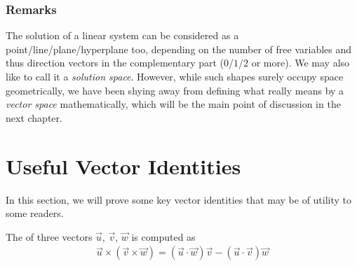 \subsubsection{Remarks}
The solution of a linear system can be considered as a point/line/plane/hyperplane too, depending on the number of free variables and thus direction vectors in the complementary part ($0$/$1$/$2$ or more). We may also like to call it a \textit{solution space}. However, while such shapes surely occupy space geometrically, we have been shying away from defining what really means by a \textit{vector space} mathematically, which will be the main point of discussion in the next chapter.

\section{Useful Vector Identities}
In this section, we will prove some key vector identities that may be of utility to some readers.
\begin{proper}
\label{proper:triplecross}
The  of three vectors $\vec{u}$, $\vec{v}$, $\vec{w}$ is computed as
\begin{align}
\vec{u} \times (\vec{v} \times \vec{w}) = (\vec{u} \cdot \vec{w})\vec{v} - (\vec{u} \cdot \vec{v})\vec{w}
\label{eqn:triplecross}
\end{align}
\end{proper}
